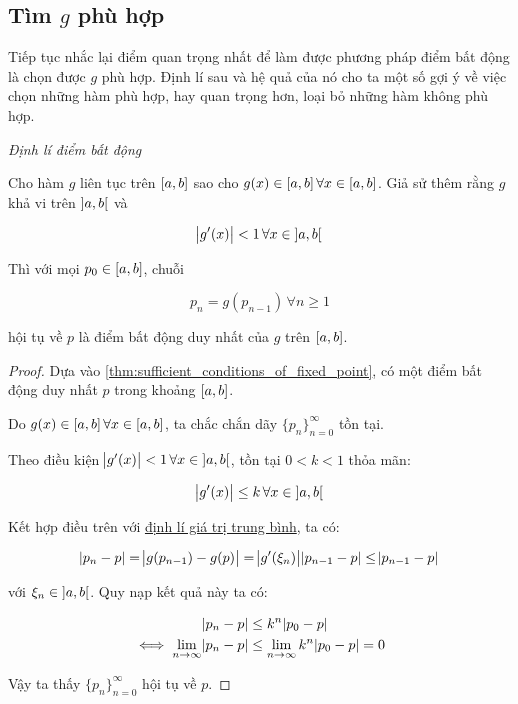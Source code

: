 \documentclass[../../Lectures]{subfiles}
\begin{document}
\subsection{Tìm \texorpdfstring{\(g\)}{g} phù hợp}

Tiếp tục nhắc lại điểm quan trọng nhất để làm được phương pháp điểm bất động là
chọn được \(g\) phù hợp. Định lí sau và hệ quả của nó cho ta một số gợi ý về
việc chọn những hàm phù hợp, hay quan trọng hơn, loại bỏ những hàm không phù
hợp.

\begin{theorem}\label{thm:fixed_point}
    \emph{Định lí điểm bất động}

    Cho hàm \(g\) liên tục trên \(\interval{a}{b}\) sao cho \(g(x) \in
    \interval{a}{b} \, \forall x \in \interval{a}{b}\). Giả sử thêm rằng \(g\)
    khả vi trên \(\interval[open]{a}{b}\) và

    \[\abs{g'(x)} < 1 \, \forall x \in \interval[open]{a}{b}\]

    Thì với mọi \(p_0 \in \interval{a}{b}\), chuỗi

    \[p_n = g(p_{n - 1}) \, \forall n \geq 1\]

    hội tụ về \(p\) là điểm bất động duy nhất của \(g\) trên
    \(\interval{a}{b}\).
\end{theorem}

\begin{proof}\label{proof:thm:fixed_point}
    Dựa vào \ref{thm:sufficient_conditions_of_fixed_point}, có một điểm bất động
    duy nhất \(p\) trong khoảng \(\interval{a}{b}\).

    Do \(g(x) \in \interval{a}{b} \, \forall x \in \interval{a}{b}\), ta chắc
    chắn dãy \(\{p_n\}_{n = 0}^\infty\) tồn tại.

    Theo điều kiện \(\abs{g'(x)} < 1 \, \forall x \in \interval[open]{a}{b}\),
    tồn tại \(0 < k < 1\) thỏa mãn:

    \[\abs{g'(x)} \leq k \, \forall x \in \interval[open]{a}{b}\]

    Kết hợp điều trên với \hyperref[thm:mean_value_theorem]{định lí giá trị
    trung bình}, ta có:

    \[\abs{p_n - p} = \abs{g(p_{n - 1}) - g(p)} = \abs{g'(\xi_n)} \abs{p_{n - 1} - p} \leq \abs{p_{n - 1} - p}\]

    với \(\xi_n \in \interval[open]{a}{b}\). Quy nạp kết quả này ta có:

    \[\begin{aligned}
                                 \abs{p_n - p} & \leq k^n \abs{p_0 - p} \\
        \iff \lim_{n \to \infty} \abs{p_n - p} & \leq \lim_{n \to \infty} k^n \abs{p_0 - p} = 0
    \end{aligned}\]

    Vậy ta thấy \(\{p_n\}_{n = 0}^\infty\) hội tụ về \(p\).
\end{proof}
\end{document}

